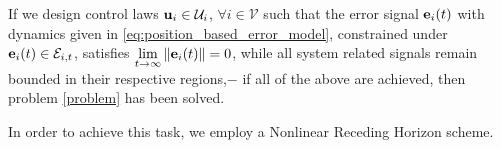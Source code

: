 If we design control laws $\bm{\mathbf{u}}_i \in \mathcal{U}_i$,
$\forall i \in \mathcal{V}$ such that the error signal $\bm{\mathbf{e}}_i(t)$ with
dynamics given in \eqref{eq:position_based_error_model}, constrained under
$\bm{\mathbf{e}}_i(t) \in \mathcal{E}_{i,t}$, satisfies
$\lim\limits_{t \to \infty} \|\bm{\mathbf{e}}_i(t)\| = 0$, while all system related
signals remain bounded in their respective regions,$-$ if all of the above are
achieved, then problem \eqref{problem} has been solved.

In order to achieve this task, we employ a Nonlinear Receding Horizon scheme.
